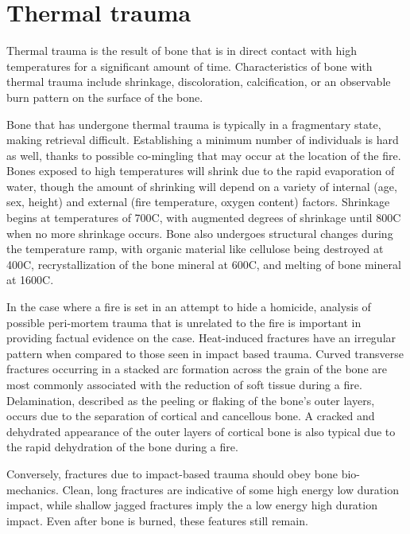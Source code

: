 \documentclass[titlepage]{article}
\begin{document}
\section{Thermal trauma}
Thermal trauma is the result of bone that is in direct contact with high temperatures for a significant amount of time. Characteristics of bone with thermal trauma include shrinkage, discoloration, calcification, or an observable burn pattern on the surface of the bone.\cite{trauma}

Bone that has undergone thermal trauma is typically in a fragmentary state, making retrieval difficult. Establishing a minimum number of individuals is hard as well, thanks to possible co-mingling that may occur at the location of the fire. Bones exposed to high temperatures will shrink due to the rapid evaporation of water, though the amount of shrinking will depend on a variety of internal (age, sex, height) and external (fire temperature, oxygen content) factors.  Shrinkage begins at temperatures of 700C, with augmented degrees of shrinkage until 800C when no more shrinkage occurs. Bone also undergoes structural changes during the temperature ramp, with organic material like cellulose being destroyed at 400C, recrystallization of the bone mineral at 600C, and melting of bone mineral at 1600C. \cite{fire}

In the case where a fire is set in an attempt to hide a homicide, analysis of possible peri-mortem trauma that is unrelated to the fire is important in providing factual evidence on the case. Heat-induced fractures have an irregular pattern when compared to those seen in impact based trauma. Curved transverse fractures occurring in a stacked arc formation across the grain of the bone are most commonly associated with the reduction of soft tissue during a fire. Delamination, described as the peeling or flaking of the bone's outer layers, occurs due to the separation of cortical and cancellous bone. A cracked and dehydrated appearance of the outer layers of cortical bone is also typical due to the rapid dehydration of the bone during a fire.\cite{fire-bone}

Conversely, fractures due to impact-based trauma should obey bone bio-mechanics. Clean, long fractures are indicative of some high energy low duration impact, while shallow jagged fractures imply the a low energy high duration impact. Even after bone is burned, these features still remain.
\end{document}
